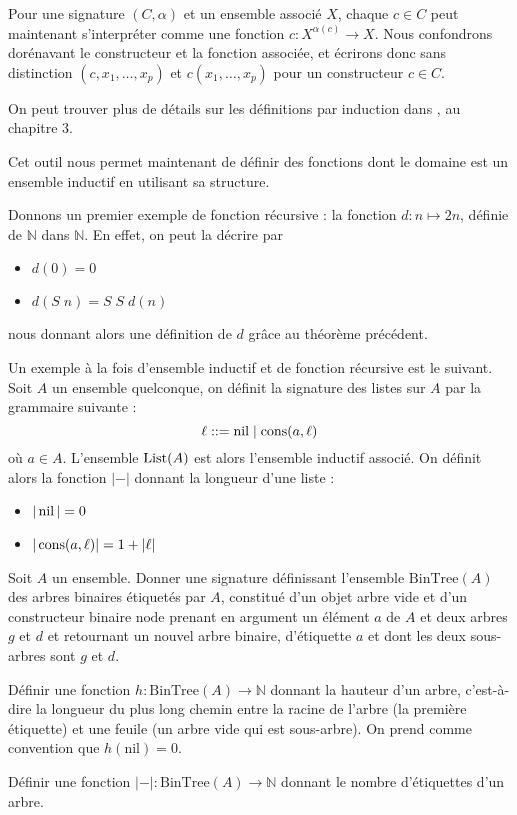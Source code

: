 \begin{remark}
  Pour une signature $(C,\alpha)$ et un ensemble associé $X$, chaque $c\in C$
  peut maintenant s'interpréter comme une fonction $c : X^{\alpha(c)}\to X$. Nous
  confondrons dorénavant le constructeur et la fonction associée, et écrirons
  donc sans distinction $(c,x_1,\ldots,x_p)$ et $c(x_1,\ldots,x_p)$ pour un
  constructeur $c \in C$.
\end{remark}

\begin{remark}
  On peut trouver plus de détails sur les définitions par induction dans
  \cite{winskell1996formal}, au chapitre $3$.
\end{remark}

Cet outil nous permet maintenant de définir des fonctions dont le domaine est
un ensemble inductif en utilisant sa structure.

\begin{example}
  Donnons un premier exemple de fonction récursive : la fonction
  $d :n\mapsto 2n$, définie de $\mathbb N$ dans $\mathbb N$. En effet, on peut
  la décrire par
  \begin{itemize}
  \item $d(0) = 0$
  \item $d(S\;n) = S\;S\;d(n)$
  \end{itemize}
  nous donnant alors une définition de $d$ grâce au théorème précédent.
\end{example}

\begin{example}
  Un exemple à la fois d'ensemble inductif et de fonction récursive est le
  suivant. Soit $A$ un ensemble quelconque, on définit la signature des listes
  sur $A$ par la grammaire suivante :
  \[\ell ::= \operatorname{nil}\mid \operatorname{cons}(a,\ell)\]
  où $a\in A$. L'ensemble $\operatorname{List}(A)$ est alors l'ensemble inductif
  associé. On définit alors la fonction $|-|$ donnant la longueur d'une
  liste :
  \begin{itemize}
  \item $|\operatorname{nil}| = 0$
  \item $|\operatorname{cons}(a,\ell)| = 1 + |\ell|$
  \end{itemize}
\end{example}

\begin{exercise}
  Soit $A$ un ensemble. Donner une signature définissant l'ensemble
  $\mathrm{BinTree}(A)$ des arbres
  binaires étiquetés par $A$, constitué d'un objet arbre vide et d'un
  constructeur binaire $\mathrm{node}$ prenant en argument un élément $a$ de $A$
  et deux arbres $g$ et $d$ et retournant un nouvel arbre binaire, d'étiquette
  $a$ et dont les deux sous-arbres sont $g$ et $d$.

  Définir une fonction $h : \mathrm{BinTree}(A) \to \mathbb N$ donnant la
  hauteur d'un arbre, c'est-à-dire la longueur du plus long chemin entre la
  racine de l'arbre (la première étiquette) et une feuile (un arbre vide qui est
  sous-arbre). On prend comme convention que $h(\mathrm{nil}) = 0$.

  Définir une fonction $|-| : \mathrm{BinTree}(A) \to \mathbb N$ donnant le
  nombre d'étiquettes d'un arbre.
\end{exercise}

